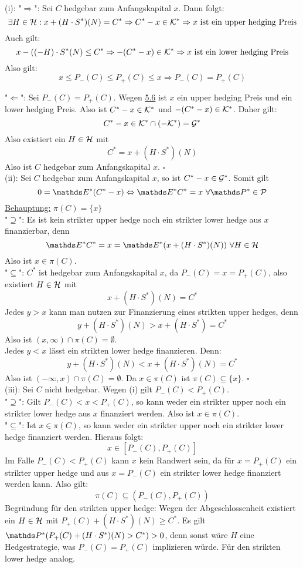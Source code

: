 \\
(i): "$\Rightarrow$":
Sei $C$ hedgebar zum Anfangskapital $x$.
Dann folgt:
\[
\exists H\in\mathcal{H}: x+(H\cdot S^*)(N)=C^* \Rightarrow C^*-x\in \mathcal{K}^* \Rightarrow x\text{ ist ein upper hedging Preis}
\]
Auch gilt:
\[
x-((-H)\cdot S^*(N)\le C^* \Rightarrow -(C^*-x)\in\mathcal{K}^* \Rightarrow x\text{ ist ein lower hedging Preis}
\]
Also gilt:
\[
x\le P_-(C)\le P_+(C)\le x \Rightarrow P_-(C)=P_+(C)
\]

"$\Leftarrow$":
Sei $P_-(C)=P_+(C)$.
Wegen \hyperref[sub:upper_lower_preise]{5.6} ist $x$ ein upper hedging Preis und ein lower hedging Preis.
Also ist $C^*-x\in \mathcal{K}^*$ und $-(C^*-x)\in\mathcal{K}^*$.
Daher gilt:
\[
C^*-x\in \mathcal{K}^*\cap (-\mathcal{K^*})=\mathcal{G}^*
\]
Also existiert ein $H\in\mathcal{H}$ mit 
\[
C^*= x+(H\cdot S^*)(N)
\]
Also ist $C$ hedgebar zum Anfangskapital $x$.
\hfill $\square$\\

(ii):
Sei $C$ hedgebar zum Anfangskapital $x$, so ist $C^*-x\in\mathcal{G}^*$.
Somit gilt
\[
0=\E^*(C^*-x) \Leftrightarrow \E^*C^*=x~\forall \Pw^*\in\mc{P}
\]
\uline{Behauptung:}
$\pi(C)=\{x\}$\\
"$\supseteq$":
Es ist kein strikter upper hedge noch ein strikter lower hedge aus $x$ finanzierbar, denn 
\[
\E^*C^* = x =  \E^*(x+(H\cdot S^*)(N))~\forall H\in\mc{H}
\]
Also ist $x\in\pi(C)$.\\

"$\subseteq$":
$C^*$ ist hedgebar zum Anfangskapital $x$, da $P_-(C)=x=P_+(C)$, also existiert $H\in\mathcal{H}$ mit
\[
x+(H\cdot S^*)(N)=C^*
\]
Jedes $y>x$ kann man nutzen zur Finanzierung eines strikten upper hedges, denn 
\[
y+(H\cdot S^*)(N)>x+(H\cdot S^*)=C^*
\]
Also ist $(x,\infty)\cap \pi(C)=\emptyset$.\\
Jedes $y<x$ lässt ein strikten lower hedge finanzieren.
Denn:
\[
y+(H\cdot S^*)(N)<x+(H\cdot S^*)(N)=C^*
\]
Also ist $(-\infty,x)\cap\pi(C)=\emptyset$.
Da $x\in\pi(C)$ ist $\pi(C)\subseteq \{x\}$.
\hfill $\square$\\

(iii):
Sei $C$ nicht hedgebar.
Wegen (i) gilt $P_-(C)<P_+(C)$.\\
"$\supseteq$":
Gilt $P_-(C)<x<P_+(C)$, so kann weder ein strikter upper noch ein strikter lower hedge aus $x$ finanziert werden.
Also ist $x\in \pi(C)$.\\
"$\subseteq$":
Ist $x\in\pi(C)$, so kann weder ein strikter upper noch ein strikter lower hedge finanziert werden.
Hieraus folgt:
\[
x\in [P_-(C),P_+(C)]
\]
Im Falle $P_-(C)<P_+(C)$ kann $x$ kein Randwert sein, da für $x=P_+(C)$ ein strikter upper hedge und aus $x=P_-(C)$ ein strikter lower hedge finanziert werden kann.
Also gilt:
\[
\pi(C)\subseteq (P_-(C),P_+(C))
\]
Begründung für den strikten upper hedge:
Wegen der Abgeschlossenheit existiert ein $H\in\mathcal{H}$ mit $P_+(C)+(H\cdot S^*)(N)\ge C^*$.
Es gilt $\Pw^*(P_+(C)+(H\cdot S^*)(N)>C^*)>0$, denn sonst wäre $H$ eine Hedgestrategie, was $P_-(C)=P_+(C)$ implizieren würde.
Für den strikten lower hedge analog.\\

